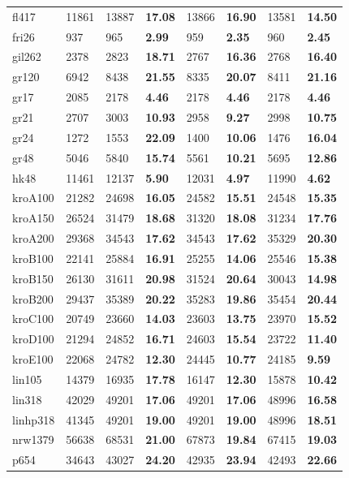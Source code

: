 \begin{figure}[!htbp]
\begin{minipage}{\linewidth}
\begin{tabular}{*{3}{L{1.6cm}} >{\bfseries}L{1.6cm} L{1.6cm} >{\bfseries}L{1.6cm} L{1.6cm} >{\bfseries}L{1.6cm}}
			fl417     & 11861  & 13887  & 17.08  & 13866  & 16.90 & 13581  & 14.50  \\
			fri26     & 937    & 965    & 2.99   & 959    & 2.35  & 960    & 2.45   \\
			gil262    & 2378   & 2823   & 18.71  & 2767   & 16.36 & 2768   & 16.40  \\
			gr120     & 6942   & 8438   & 21.55  & 8335   & 20.07 & 8411   & 21.16  \\
			gr17      & 2085   & 2178   & 4.46   & 2178   & 4.46  & 2178   & 4.46   \\
			gr21      & 2707   & 3003   & 10.93  & 2958   & 9.27  & 2998   & 10.75  \\
			gr24      & 1272   & 1553   & 22.09  & 1400   & 10.06 & 1476   & 16.04  \\
			gr48      & 5046   & 5840   & 15.74  & 5561   & 10.21 & 5695   & 12.86  \\
			hk48      & 11461  & 12137  & 5.90   & 12031  & 4.97  & 11990  & 4.62   \\
			kroA100   & 21282  & 24698  & 16.05  & 24582  & 15.51 & 24548  & 15.35  \\
			kroA150   & 26524  & 31479  & 18.68  & 31320  & 18.08 & 31234  & 17.76  \\
			kroA200   & 29368  & 34543  & 17.62  & 34543  & 17.62 & 35329  & 20.30  \\
			kroB100   & 22141  & 25884  & 16.91  & 25255  & 14.06 & 25546  & 15.38  \\
			kroB150   & 26130  & 31611  & 20.98  & 31524  & 20.64 & 30043  & 14.98  \\
			kroB200   & 29437  & 35389  & 20.22  & 35283  & 19.86 & 35454  & 20.44  \\
			kroC100   & 20749  & 23660  & 14.03  & 23603  & 13.75 & 23970  & 15.52  \\
			kroD100   & 21294  & 24852  & 16.71  & 24603  & 15.54 & 23722  & 11.40  \\
			kroE100   & 22068  & 24782  & 12.30  & 24445  & 10.77 & 24185  & 9.59   \\
			lin105    & 14379  & 16935  & 17.78  & 16147  & 12.30 & 15878  & 10.42  \\
			lin318    & 42029  & 49201  & 17.06  & 49201  & 17.06 & 48996  & 16.58  \\
			linhp318  & 41345  & 49201  & 19.00  & 49201  & 19.00 & 48996  & 18.51  \\
			nrw1379   & 56638  & 68531  & 21.00  & 67873  & 19.84 & 67415  & 19.03  \\
			p654      & 34643  & 43027  & 24.20  & 42935  & 23.94 & 42493  & 22.66  \\

\end{tabular}
\end{minipage}
\end{figure}
